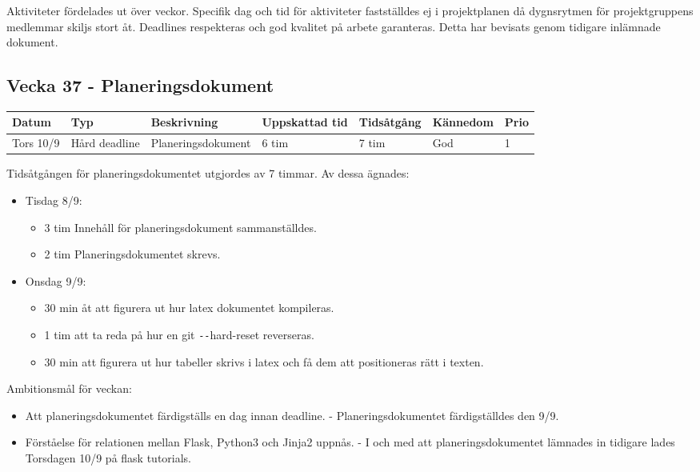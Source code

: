 \documentclass{TDP003mall}
\begin{document}
 Aktiviteter fördelades ut över veckor. Specifik dag och tid för aktiviteter fastställdes ej i projektplanen då dygnsrytmen för projektgruppens medlemmar skiljs stort åt. Deadlines respekteras och god kvalitet på arbete garanteras. Detta har bevisats genom tidigare inlämnade dokument.

 \subsection*{Vecka 37 - Planeringsdokument}
 
\begin{tabularx}{\linewidth}{|l|l|X|l|l|l|l|}
  \hline
  Datum     & Typ           & Beskrivning        & Uppskattad tid & Tidsåtgång & Kännedom & Prio \\ [0.5ex]
  \hline                                             
  Tors 10/9 & Hård deadline & Planeringsdokument & 6 tim          & 7 tim      & God      & 1    \\
  \hline
\end{tabularx}

Tidsåtgången för planeringsdokumentet utgjordes av 7 timmar. Av dessa ägnades:
\begin{itemize}
  \item Tisdag 8/9:
  \begin{itemize}
    \item 3 tim Innehåll för planeringsdokument sammanställdes.
    \item 2 tim Planeringsdokumentet skrevs.
  \end{itemize}
  \item Onsdag 9/9:
  \begin{itemize}
    \item 30 min åt att figurera ut hur latex dokumentet kompileras.
    \item 1 tim att ta reda på hur en git \texttt{-{}-}hard-reset reverseras.
    \item 30 min att figurera ut hur tabeller skrivs i latex och få dem att positioneras rätt i texten.\\
  \end{itemize}
      \end{itemize}

      Ambitionsmål för veckan:
      \begin{itemize}
      \item Att planeringsdokumentet färdigställs en dag innan deadline. - Planeringsdokumentet färdigställdes den 9/9.
      \item Förståelse för relationen mellan Flask, Python3 och Jinja2 uppnås. - I och med att planeringsdokumentet lämnades in tidigare lades Torsdagen 10/9 på flask tutorials.
      \end{itemize}
      
\end{document}

